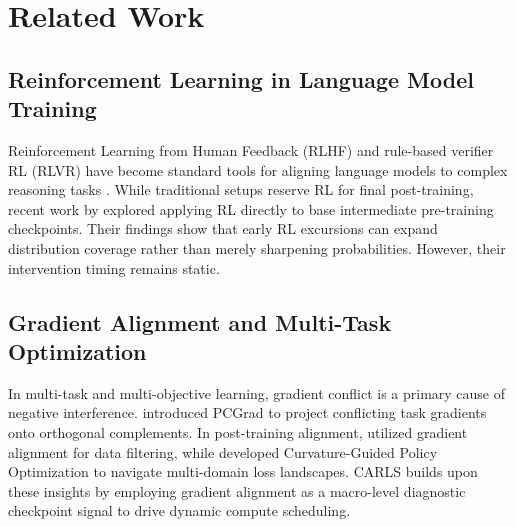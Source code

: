 \section{Related Work}
\label{sec:related_work}

\subsection{Reinforcement Learning in Language Model Training}
Reinforcement Learning from Human Feedback (RLHF) and rule-based verifier RL (RLVR) have become standard tools for aligning language models to complex reasoning tasks \citep{huang2025reinforcement}. While traditional setups reserve RL for final post-training, recent work by \citet{bansal2026rl} explored applying RL directly to base intermediate pre-training checkpoints. Their findings show that early RL excursions can expand distribution coverage rather than merely sharpening probabilities. However, their intervention timing remains static.

\subsection{Gradient Alignment and Multi-Task Optimization}
In multi-task and multi-objective learning, gradient conflict is a primary cause of negative interference. \citet{yu2020pcgrad} introduced PCGrad to project conflicting task gradients onto orthogonal complements. In post-training alignment, \citet{zhang2025learnalign} utilized gradient alignment for data filtering, while \citet{wang2025cgpo} developed Curvature-Guided Policy Optimization to navigate multi-domain loss landscapes. CARLS builds upon these insights by employing gradient alignment as a macro-level diagnostic checkpoint signal to drive dynamic compute scheduling.
